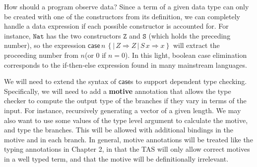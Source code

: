 How should a program observe data? Since a term of a given data type
can only be created with one of the constructors from its definition,
we can completely handle a data expression if each possible constructor
is accounted for. For instance, $\mathtt{Nat}$ has the two constructors
$\mathtt{Z}$ and $\mathtt{S}$ (which holds the preceding number),
so the expression $\mathsf{case}\,n\,\left\{ |\,Z\Rightarrow Z\,|\,S\,x\Rightarrow x\right\} $
will extract the proceeding number from $n$(or $0$ if $n=0$). In
this light, boolean case elimination corresponds to the if-then-else
expression found in many mainstream languages. 

We will need to extend the syntax of $\mathsf{case}$s to support
dependent type checking. Specifically, we will need to add a \textbf{motive}
annotation that allows the type checker to compute the output type
of the branches if they vary in terms of the input. For instance,
recursively generating a vector of a given length.
We may also want to use some values of the type level argument to
calculate the motive, and type the branches. This will be allowed
with additional bindings in the motive and in each branch.
In general, motive annotations will be treated like the typing annotations
in Chapter 2, in that the TAS will only allow correct motives in a
well typed term, and that the motive will be definitionally irrelevant.

